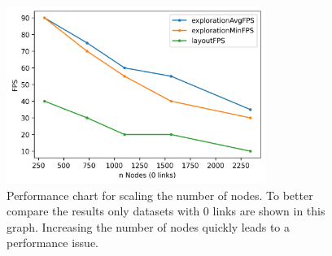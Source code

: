 \begin{table}[!hbt]
     \caption{Results from performance measurement evaluation (expl. ... exploration). Test setup: Ryzen 7 3700X + Radeon RX 590.}
     \label{table:resultFPS}
\end{table}

\begin{figure}[!hbt]
    \centering
    \includegraphics[width=0.75\textwidth]{graphics/performanceAnalysisNodes.png}
    \caption{Performance chart for scaling the number of nodes. To better compare the results only datasets with 0 links are shown in this graph. Increasing the number of nodes quickly leads to a performance issue.} 
    \label{fig:performanceNodes} 
\end{figure}

